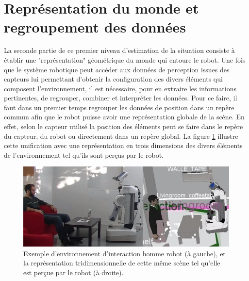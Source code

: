 \documentclass[a4paper,11pt,twoside]{StyleThese}
\begin{document}

\section{Représentation du monde et regroupement des données}
\label{sec:ws}
La seconde partie de ce premier niveau d'estimation de la situation consiste à établir une "représentation" géométrique du monde qui entoure le robot. Une fois que le système robotique peut accéder aux données de perception issues des capteurs lui permettant d'obtenir la configuration des divers éléments qui composent l'environnement, il est nécessaire, pour en extraire les informations pertinentes, de regrouper, combiner et interpréter les données. Pour ce faire, il faut dans un premier temps regrouper les données de position dans un repère commun afin que le robot puisse avoir une représentation globale de la scène. En effet, selon le capteur utilisé la position des éléments peut se faire dans le repère du capteur, du robot ou directement dans un repère global. La figure
\ref{fig:real} illustre cette unification avec une représentation en trois dimensions des divers éléments de l'environnement tel qu'ils sont perçus par le robot.



\begin{figure}[ht!]
 \centering
  \includegraphics[width=0.99\linewidth]{./img/real.jpg} 
  \caption {Exemple d'environnement d'interaction homme robot (à gauche), et la représentation tridimensionnelle de cette même scène tel qu'elle est perçue par le robot (à droite).}
  \label{fig:real}
\end{figure}
\end{document}
